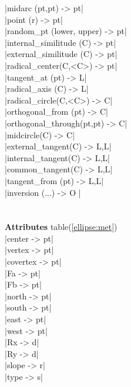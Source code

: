 \documentclass[DIV         = 14,
               fontsize    = 10,
               index       = totoc,
               twoside,
               cadre,
               headings    = small
               ]{tkz-doc}
\begin{document}
\begin{multicols}{3}
|midarc (pt,pt)            -> pt|  \\     
|point (r)                 -> pt|  \\     
|random_pt (lower, upper)  -> pt|  \\     
|internal_similitude (C)   -> pt|  \\     
|external_similitude (C)   -> pt|  \\       
|radical_center(C,<C>)     -> pt|  \\
|tangent_at (pt)           -> L|   \\     
|radical_axis (C)          -> L|   \\     
|radical_circle(C,<C>)     -> C|   \\     
|orthogonal_from (pt)      -> C|   \\     
|orthogonal_through(pt,pt) -> C|   \\
|midcircle(C)              -> C|   \\
|external_tangent(C)       -> L,L| \\
|internal_tangent(C)       -> L,L| \\
|common_tangent(C)         -> L,L| \\
|tangent_from (pt)         -> L,L| \\
|inversion (...)           -> O |  \\
                                   \\
            \\
\textbf{Attributes} table(\ref{ellipse:met})      \\
|center                    -> pt|  \\
|vertex                    -> pt|  \\
|covertex                  -> pt|  \\
|Fa                        -> pt|  \\
|Fb                        -> pt|  \\
|north                     -> pt|  \\
|south                     -> pt|  \\
|east                      -> pt|  \\
|west                      -> pt|  \\
|Rx                        -> d|   \\
|Ry                        -> d|   \\
|slope                     -> r|   \\
|type                      -> s|   \\

\end{multicols}
\end{document}
